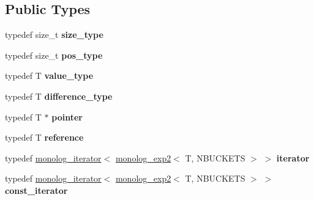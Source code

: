 \subsection*{Public Types}
\begin{DoxyCompactItemize}
\item 
\mbox{\label{classdialog_1_1monolog_1_1monolog__exp2_a34c79ea90c9e6e08e5ba2572b5373344}} 
typedef size\+\_\+t {\bfseries size\+\_\+type}
\item 
\mbox{\label{classdialog_1_1monolog_1_1monolog__exp2_a48ff12ea0a19afa90c4ed768b2abe0d8}} 
typedef size\+\_\+t {\bfseries pos\+\_\+type}
\item 
\mbox{\label{classdialog_1_1monolog_1_1monolog__exp2_aa56e194d4f9091f40c6799346fd82875}} 
typedef T {\bfseries value\+\_\+type}
\item 
\mbox{\label{classdialog_1_1monolog_1_1monolog__exp2_af5ab804b2a646c5e449e595c9fb2309b}} 
typedef T {\bfseries difference\+\_\+type}
\item 
\mbox{\label{classdialog_1_1monolog_1_1monolog__exp2_afb7ebe452ad7e4ce9fe56b021a1dc4a2}} 
typedef T $\ast$ {\bfseries pointer}
\item 
\mbox{\label{classdialog_1_1monolog_1_1monolog__exp2_a5be0c26b9eba0deaf251ef535fcba405}} 
typedef T {\bfseries reference}
\item 
\mbox{\label{classdialog_1_1monolog_1_1monolog__exp2_a3dbe25f120cab3ba2754c327e7274b25}} 
typedef \hyperlink{classdialog_1_1monolog_1_1monolog__iterator}{monolog\+\_\+iterator}$<$ \hyperlink{classdialog_1_1monolog_1_1monolog__exp2}{monolog\+\_\+exp2}$<$ T, N\+B\+U\+C\+K\+E\+TS $>$ $>$ {\bfseries iterator}
\item 
\mbox{\label{classdialog_1_1monolog_1_1monolog__exp2_afb269a7cad947b4222037aff4bdf2158}} 
typedef \hyperlink{classdialog_1_1monolog_1_1monolog__iterator}{monolog\+\_\+iterator}$<$ \hyperlink{classdialog_1_1monolog_1_1monolog__exp2}{monolog\+\_\+exp2}$<$ T, N\+B\+U\+C\+K\+E\+TS $>$ $>$ {\bfseries const\+\_\+iterator}
\end{DoxyCompactItemize}
